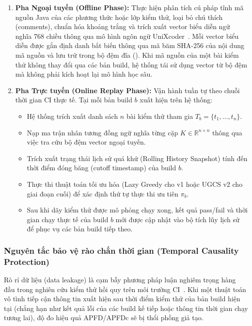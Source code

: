 \begin{enumerate}
    \item \textbf{Pha Ngoại tuyến (Offline Phase):}
    Thực hiện phân tích cú pháp tĩnh mã nguồn Java của các phương thức hoặc lớp kiểm thử, loại bỏ chú thích (comments), chuẩn hóa khoảng trắng và trích xuất vector biểu diễn ngữ nghĩa 768 chiều thông qua mô hình ngôn ngữ UniXcoder~\cite{guo2022unixcoder}. Mỗi vector biểu diễn được gắn định danh bất biến thông qua mã băm SHA-256 của nội dung mã nguồn và lưu trữ trong bộ đệm đĩa (). Khi mã nguồn của một bài kiểm thử không thay đổi qua các bản build, hệ thống tái sử dụng vector từ bộ đệm mà không phải kích hoạt lại mô hình học sâu.
    
    \item \textbf{Pha Trực tuyến (Online Replay Phase):}
    Vận hành tuần tự theo chuỗi thời gian CI thực tế. Tại mỗi bản build $b$ xuất hiện trên hệ thống:
    \begin{itemize}
        \item Hệ thống trích xuất danh sách $n$ bài kiểm thử tham gia $T_b = \{t_1, \dots, t_n\}$.
        \item Nạp ma trận nhân tương đồng ngữ nghĩa từng cặp $K \in \mathbb{R}^{n \times n}$ thông qua việc tra cứu bộ đệm vector ngoại tuyến.
        \item Trích xuất trạng thái lịch sử quá khứ (Rolling History Snapshot) tính đến thời điểm đóng băng (cutoff timestamp) của build $b$.
        \item Thực thi thuật toán tối ưu hóa (Lazy Greedy cho v1 hoặc UGCS v2 cho giai đoạn cuối) để xác định thứ tự thực thi ưu tiên $\pi_b$.
        \item Sau khi dãy kiểm thử được mô phỏng chạy xong, kết quả pass/fail và thời gian chạy thực tế của build $b$ mới được cập nhật vào bộ tích lũy lịch sử để phục vụ các bản build tiếp theo.
    \end{itemize}
\end{enumerate}

\subsubsection{Nguyên tắc bảo vệ rào chắn thời gian (Temporal Causality Protection)}
\label{subsubsec:leakage_prevention}

Rò rỉ dữ liệu (data leakage) là cạm bẫy phương pháp luận nghiêm trọng hàng đầu trong nghiên cứu kiểm thử hồi quy trên môi trường CI~\cite{dante2026, henard2016comparing}. Khi một thuật toán vô tình tiếp cận thông tin xuất hiện sau thời điểm kiểm thử của bản build hiện tại (chẳng hạn như kết quả lỗi của các build kế tiếp hoặc thông tin thời gian chạy tương lai), độ đo hiệu quả APFD/APFDc sẽ bị thổi phồng giả tạo.

